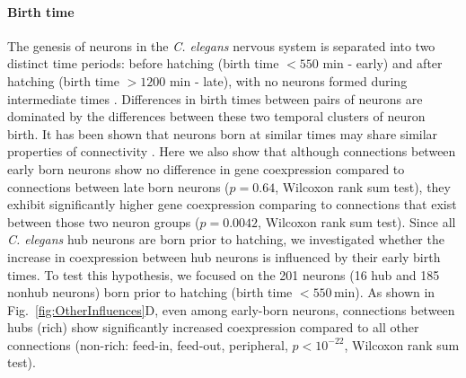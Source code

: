 \documentclass[10pt,letterpaper]{article}
\begin{document}
\paragraph{Birth time}
The genesis of neurons in the \emph{C. elegans} nervous system is separated into two distinct time periods: before hatching (birth time $<550$ min - early) and after hatching (birth time $>1200$ min - late), with no neurons formed during intermediate times \cite{Varier2011}.
Differences in birth times between pairs of neurons are dominated by the differences between these two temporal clusters of neuron birth.
It has been shown that neurons born at similar times may share similar properties of connectivity \cite{Schroter:2017eo}. 
Here we also show that although connections between early born neurons show no difference in gene coexpression compared to connections between late born neurons ($p=0.64$, Wilcoxon rank sum test), they exhibit significantly higher gene coexpression comparing to connections that exist between those two neuron groups ($p = 0.0042$, Wilcoxon rank sum test).
Since all \emph{C. elegans} hub neurons are born prior to hatching, we investigated whether the increase in coexpression between hub neurons is influenced by their early birth times.
To test this hypothesis, we focused on the 201 neurons (16 hub and 185 nonhub neurons) born prior to hatching (birth time $<550$\,min).
As shown in Fig.~\ref{fig:OtherInfluences}D, even among early-born neurons, connections between hubs (rich) show significantly increased coexpression compared to all other connections (non-rich: feed-in, feed-out, peripheral, $p < 10^{-22}$, Wilcoxon rank sum test).

\end{document}
